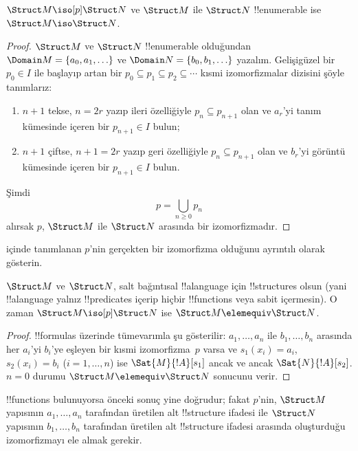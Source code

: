 \documentclass[../../../include/open-logic-section]{subfiles}
\begin{document}
\begin{thm}
  $\Struct M\iso[p]\Struct N$ ve $\Struct M$ ile $\Struct N$
  !!{enumerable} ise $\Struct M\iso\Struct N$.
\end{thm}

\begin{proof}
  $\Struct M$ ve $\Struct N$ !!{enumerable} olduğundan
  $\Domain M=\{a_0,a_1,\ldots\}$ ve
  $\Domain N=\{b_0,b_1,\ldots\}$ yazalım. Gelişigüzel bir $p_0\in I$
  ile başlayıp artan bir
  $p_0\subseteq p_1\subseteq p_2\subseteq\cdots$ kısmi izomorfizmalar
  dizisini şöyle tanımlarız:
  \begin{enumerate}
  \item $n+1$ tekse, $n=2r$ yazıp ileri özelliğiyle
    $p_n\subseteq p_{n+1}$ olan ve $a_r$'yi tanım kümesinde içeren bir
    $p_{n+1}\in I$ bulun;
  \item $n+1$ çiftse, $n+1=2r$ yazıp geri özelliğiyle
    $p_n\subseteq p_{n+1}$ olan ve $b_r$'yi görüntü kümesinde içeren bir
    $p_{n+1}\in I$ bulun.
  \end{enumerate}
Şimdi
\[
p=\bigcup_{n\geq0}p_n
\]
alırsak $p$, $\Struct M$ ile $\Struct N$ arasında bir izomorfizmadır.
\end{proof}

\begin{prob}
   içinde tanımlanan $p$'nin gerçekten
  bir izomorfizma olduğunu ayrıntılı olarak gösterin.
\end{prob}

\begin{thm}
  $\Struct M$ ve $\Struct N$, salt bağıntısal !!a{language} için
  !!{structure}s olsun (yani !!a{language} yalnız !!{predicate}s
  içerip hiçbir !!{function}s veya sabit içermesin). O zaman
  $\Struct M\iso[p]\Struct N$ ise
  $\Struct M\elemequiv\Struct N$.
\end{thm}

\begin{proof}
  !!{formula}s üzerinde tümevarımla şu gösterilir: $a_1,\dots,a_n$ ile
  $b_1,\dots,b_n$ arasında her $a_i$'yi $b_i$'ye eşleyen bir kısmi
  izomorfizma~$p$ varsa ve $s_1(x_i)=a_i$, $s_2(x_i)=b_i$
  ($i=1,\dots,n$) ise $\Sat{M}{!A}[s_1]$ ancak ve ancak
  $\Sat{N}{!A}[s_2]$. $n=0$ durumu
  $\Struct M\elemequiv\Struct N$ sonucunu verir.
\end{proof}

\begin{rem}
!!{function}s bulunuyorsa önceki sonuç yine doğrudur; fakat $p$'nin,
$\Struct M$ yapısının $a_1,\dots,a_n$ tarafından üretilen alt
!!{structure} ifadesi ile $\Struct N$ yapısının $b_1,\dots,b_n$
tarafından üretilen alt !!{structure} ifadesi arasında oluşturduğu
izomorfizmayı ele almak gerekir.
\end{rem}
\end{document}
